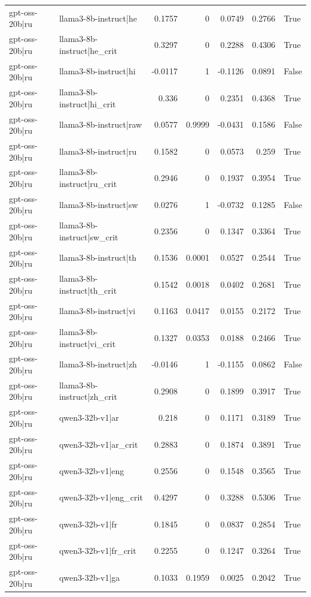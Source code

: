 \begin{table}
\begin{tabular}{l l r r r r l}
gpt-oss-20b|ru & llama3-8b-instruct|he & 0.1757 & 0 & 0.0749 & 0.2766 & True \\
gpt-oss-20b|ru & llama3-8b-instruct|he_crit & 0.3297 & 0 & 0.2288 & 0.4306 & True \\
gpt-oss-20b|ru & llama3-8b-instruct|hi & -0.0117 & 1 & -0.1126 & 0.0891 & False \\
gpt-oss-20b|ru & llama3-8b-instruct|hi_crit & 0.336 & 0 & 0.2351 & 0.4368 & True \\
gpt-oss-20b|ru & llama3-8b-instruct|raw & 0.0577 & 0.9999 & -0.0431 & 0.1586 & False \\
gpt-oss-20b|ru & llama3-8b-instruct|ru & 0.1582 & 0 & 0.0573 & 0.259 & True \\
gpt-oss-20b|ru & llama3-8b-instruct|ru_crit & 0.2946 & 0 & 0.1937 & 0.3954 & True \\
gpt-oss-20b|ru & llama3-8b-instruct|sw & 0.0276 & 1 & -0.0732 & 0.1285 & False \\
gpt-oss-20b|ru & llama3-8b-instruct|sw_crit & 0.2356 & 0 & 0.1347 & 0.3364 & True \\
gpt-oss-20b|ru & llama3-8b-instruct|th & 0.1536 & 0.0001 & 0.0527 & 0.2544 & True \\
gpt-oss-20b|ru & llama3-8b-instruct|th_crit & 0.1542 & 0.0018 & 0.0402 & 0.2681 & True \\
gpt-oss-20b|ru & llama3-8b-instruct|vi & 0.1163 & 0.0417 & 0.0155 & 0.2172 & True \\
gpt-oss-20b|ru & llama3-8b-instruct|vi_crit & 0.1327 & 0.0353 & 0.0188 & 0.2466 & True \\
gpt-oss-20b|ru & llama3-8b-instruct|zh & -0.0146 & 1 & -0.1155 & 0.0862 & False \\
gpt-oss-20b|ru & llama3-8b-instruct|zh_crit & 0.2908 & 0 & 0.1899 & 0.3917 & True \\
gpt-oss-20b|ru & qwen3-32b-v1|ar & 0.218 & 0 & 0.1171 & 0.3189 & True \\
gpt-oss-20b|ru & qwen3-32b-v1|ar_crit & 0.2883 & 0 & 0.1874 & 0.3891 & True \\
gpt-oss-20b|ru & qwen3-32b-v1|eng & 0.2556 & 0 & 0.1548 & 0.3565 & True \\
gpt-oss-20b|ru & qwen3-32b-v1|eng_crit & 0.4297 & 0 & 0.3288 & 0.5306 & True \\
gpt-oss-20b|ru & qwen3-32b-v1|fr & 0.1845 & 0 & 0.0837 & 0.2854 & True \\
gpt-oss-20b|ru & qwen3-32b-v1|fr_crit & 0.2255 & 0 & 0.1247 & 0.3264 & True \\
gpt-oss-20b|ru & qwen3-32b-v1|ga & 0.1033 & 0.1959 & 0.0025 & 0.2042 & True \\

\end{tabular}
\end{table}
